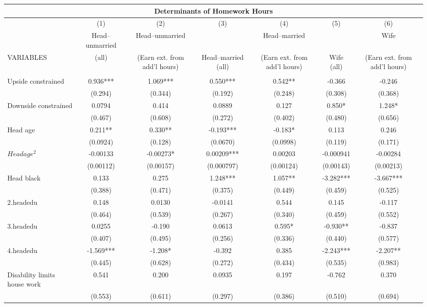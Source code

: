 \begin{tabular}{lcccccc}
\multicolumn{7}{c}{Determinants of Homework Hours} \\ \hline
 & (1) & (2) & (3) & (4) & (5) & (6) \\
 & Head--unmarried & Head--unmarried &  & Head--married &  & Wife \\
VARIABLES & (all) & (Earn ext. from add'l hours) & Head--married (all) & (Earn ext. from add'l hours) & Wife (all) & (Earn ext. from add'l hours) \\ \hline
 &  &  &  &  &  &  \\
Upside constrained & 0.936*** & 1.069*** & 0.550*** & 0.542** & -0.366 & -0.246 \\
 & (0.294) & (0.344) & (0.192) & (0.248) & (0.308) & (0.368) \\
Downside constrained & 0.0794 & 0.414 & 0.0889 & 0.127 & 0.850* & 1.248* \\
 & (0.467) & (0.608) & (0.272) & (0.402) & (0.480) & (0.656) \\
Head age & 0.211** & 0.330** & -0.193*** & -0.183* & 0.113 & 0.246 \\
 & (0.0924) & (0.128) & (0.0670) & (0.0998) & (0.119) & (0.171) \\
$ Head age^2$ & -0.00133 & -0.00273* & 0.00209*** & 0.00203 & -0.000941 & -0.00284 \\
 & (0.00112) & (0.00157) & (0.000797) & (0.00124) & (0.00143) & (0.00213) \\
Head black & 0.133 & 0.275 & 1.248*** & 1.057** & -3.282*** & -3.667*** \\
 & (0.388) & (0.471) & (0.375) & (0.449) & (0.459) & (0.525) \\
2.headedu & 0.148 & 0.0130 & -0.0141 & 0.544 & 0.145 & -0.117 \\
 & (0.464) & (0.539) & (0.267) & (0.340) & (0.459) & (0.552) \\
3.headedu & 0.0255 & -0.190 & 0.0613 & 0.595* & -0.930** & -0.837 \\
 & (0.407) & (0.495) & (0.256) & (0.336) & (0.440) & (0.577) \\
4.headedu & -1.569*** & -1.208* & -0.392 & 0.385 & -2.243*** & -2.207** \\
 & (0.445) & (0.628) & (0.272) & (0.434) & (0.535) & (0.983) \\
Disability limits house work & 0.541 & 0.200 & 0.0935 & 0.197 & -0.762 & 0.370 \\
 & (0.553) & (0.611) & (0.297) & (0.386) & (0.510) & (0.694) \\

\end{tabular}
